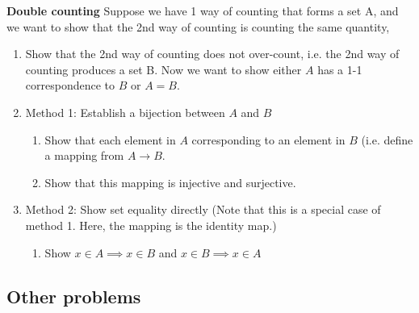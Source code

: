 \documentclass{article}
\begin{document}
\textbf{Double counting}
Suppose we have 1 way of counting that forms a set A, and we want to show that the 2nd way of counting is counting the same quantity, 
\begin{enumerate} 
    \item Show that the 2nd way of counting does not over-count, i.e. the 2nd way of counting produces a set B. Now we want to show either $A$ has a 1-1 correspondence to $B$ or $A=B$.
    \item Method 1: Establish a bijection between $A$ and $B$
    \begin{enumerate}
        \item Show that each element in $A$ corresponding to an element in $B$ (i.e. define a mapping from $A\rightarrow B$.
        \item Show that this mapping is injective and surjective.
    \end{enumerate}
    \item Method 2: Show set equality directly (Note that this is a special case of method 1. Here, the mapping is the identity map.)
    \begin{enumerate}
        \item Show $x\in A\implies x\in B$ and $x\in B\implies x\in A$
    \end{enumerate}
\end{enumerate}


\subsection{Other problems}
\end{document}
